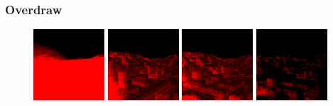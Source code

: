 \subsubsection*{Overdraw}

\begin{figure}[!htb]
  \centering
  \includegraphics[height=100px]{images/graphics/overdraw-terrain1-nocull.png}
  \includegraphics[height=100px]{images/graphics/overdraw-terrain1-pooc.png}
  \includegraphics[height=100px]{images/graphics/overdraw-terrain1-pmoc.png}
  \includegraphics[height=100px]{images/graphics/overdraw-terrain1-diff.png}


\end{figure}
